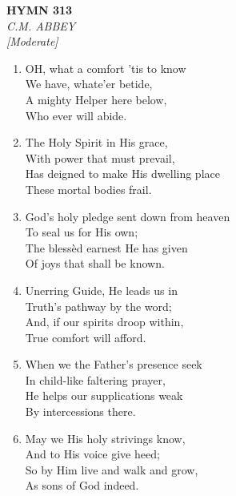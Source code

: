 \documentclass[11pt,a4paper]{article}
\begin{document}
\newpage
\begin{center}
    {\Large \textbf{HYMN 313}}
    \\
    \textit{C.M. ABBEY}
    \\
    \textit{\small [Moderate]}
\end{center}
\vspace{1em}

\begin{enumerate}
    \item OH, what a comfort 'tis to know \\
        We have, whate'er betide, \\
        A mighty Helper here below, \\
        Who ever will abide.

    \item The Holy Spirit in His grace, \\
        With power that must prevail, \\
        Has deigned to make His dwelling place \\
        These mortal bodies frail.

    \item God's holy pledge sent down from heaven \\
        To seal us for His own; \\
        The bless\`ed earnest He has given \\
        Of joys that shall be known.

    \item Unerring Guide, He leads us in \\
        Truth's pathway by the word; \\
        And, if our spirits droop within, \\
        True comfort will afford.

    \item When we the Father's presence seek \\
        In child-like faltering prayer, \\
        He helps our supplications weak \\
        By intercessions there.

    \item May we His holy strivings know, \\
        And to His voice give heed; \\
        So by Him live and walk and grow, \\
        As sons of God indeed.

\end{enumerate}
\end{document}
